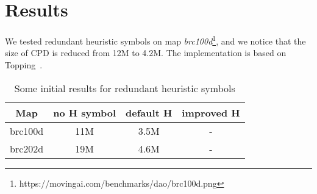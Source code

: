 \section{Results}
\label{sec:results}

We tested redundant heuristic symbols on map
\textit{brc100d}\footnote{https://movingai.com/benchmarks/dao/brc100d.png}, and we notice that
the size of CPD is reduced from 12M to 4.2M. The implementation is based on
Topping~\cite{DBLP:conf/aips/SalvettiBGHS18}.

\begin{table}[h]
  \centering
  \begin{tabular}{|c|c|c|c|}
  \hline
    Map       &   no H symbol &  default H & improved H   \\
  \hline
    brc100d   &   11M         &  3.5M      &    -         \\
  \hline
    brc202d   &   19M         &  4.6M      &    -         \\
  \hline
  \end{tabular}
\caption{Some initial results for redundant heuristic symbols}
\end{table}


